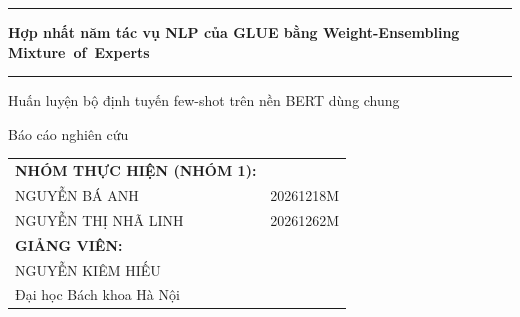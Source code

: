 \thispagestyle{empty}
\vspace*{4mm}

\noindent\textcolor{NavyBlue}{\rule{\linewidth}{1pt}}
\begin{center}
	\fontsize{26}{32} \color{NavyBlue} \selectfont
	\textbf{Hợp nhất năm tác vụ NLP của GLUE bằng Weight-Ensembling \mbox{Mixture of Experts}}
\end{center}

\noindent\textcolor{NavyBlue}{\rule{\linewidth}{1pt}}

\begin{center}
	\fontsize{17}{21} \selectfont
	Huấn luyện bộ định tuyến few-shot trên nền BERT dùng chung
\end{center}

\vspace*{2mm}
\begin{center}
	\fontsize{14}{14} \selectfont Báo cáo nghiên cứu
\end{center}
\vspace*{6mm}

\begin{center}
	\def\baselinestretch{1.0}\color{NavyBlue}
	{\fontsize{13}{13} \selectfont
		\begin{tabular}{l l}
			{\bf NHÓM THỰC HIỆN (NHÓM 1):} & \\[4mm]
			\hspace{13mm} NGUYỄN BÁ ANH & 20261218M\\[3mm]
			\hspace{13mm} NGUYỄN THỊ NHÃ LINH & 20261262M\\[6mm]
			{\bf GIẢNG VIÊN:} & \\[4mm]
			\hspace{13mm} NGUYỄN KIÊM HIẾU & \\[6mm]
			\hspace{13mm} Đại học Bách khoa Hà Nội & \\[3mm]
	\end{tabular}}
\end{center}
